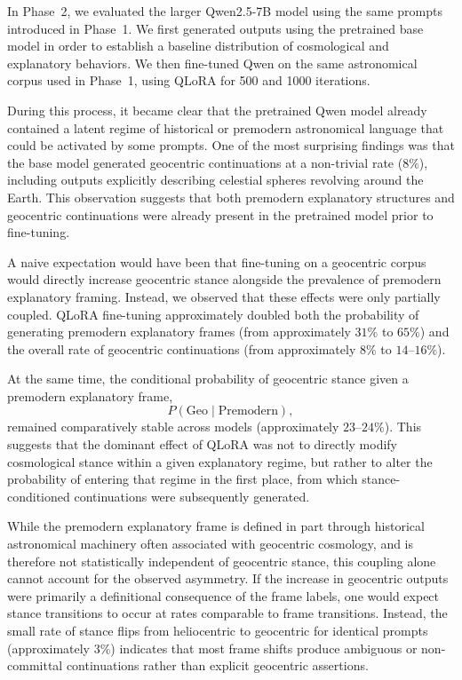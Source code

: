 In Phase~2, we evaluated the larger Qwen2.5-7B model using the same prompts introduced in Phase~1. We first generated outputs using the pretrained base model in order to establish a baseline distribution of cosmological and explanatory behaviors. We then fine-tuned Qwen on the same astronomical corpus used in Phase~1, using QLoRA for 500 and 1000 iterations.

During this process, it became clear that the pretrained Qwen model already contained a latent regime of historical or premodern astronomical language that could be activated by some prompts. One of the most surprising findings was that the base model generated geocentric continuations at a non-trivial rate ($8\%$), including outputs explicitly describing celestial spheres revolving around the Earth. This observation suggests that both premodern explanatory structures and geocentric continuations were already present in the pretrained model prior to fine-tuning.

A naive expectation would have been that fine-tuning on a geocentric corpus would directly increase geocentric stance alongside the prevalence of premodern explanatory framing. Instead, we observed that these effects were only partially coupled. QLoRA fine-tuning approximately doubled both the probability of generating premodern explanatory frames (from approximately $31\%$ to $65\%$) and the overall rate of geocentric continuations (from approximately $8\%$ to $14$--$16\%$). 

At the same time, the conditional probability of geocentric stance given a premodern explanatory frame,
\[
P(\mathrm{Geo}\mid \mathrm{Premodern}),
\]
remained comparatively stable across models (approximately $23$--$24\%$). This suggests that the dominant effect of QLoRA was not to directly modify cosmological stance within a given explanatory regime, but rather to alter the probability of entering that regime in the first place, from which stance-conditioned continuations were subsequently generated.

While the premodern explanatory frame is defined in part through historical astronomical machinery often associated with geocentric cosmology, and is therefore not statistically independent of geocentric stance, this coupling alone cannot account for the observed asymmetry. If the increase in geocentric outputs were primarily a definitional consequence of the frame labels, one would expect stance transitions to occur at rates comparable to frame transitions. Instead, the small rate of stance flips from heliocentric to geocentric for identical prompts (approximately $3\%$) indicates that most frame shifts produce ambiguous or non-committal continuations rather than explicit geocentric assertions.

